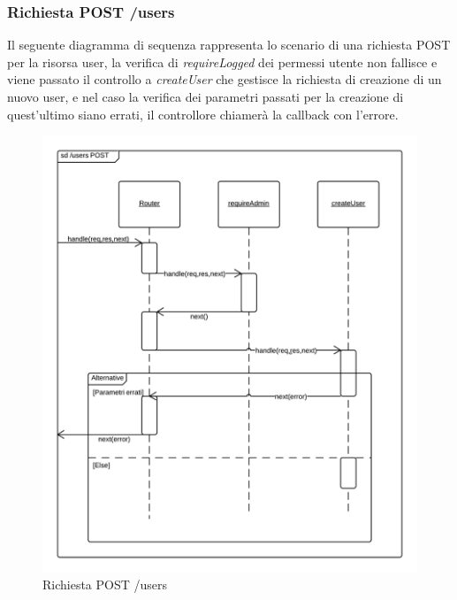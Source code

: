 \subsubsection{Richiesta POST /users} 
Il seguente diagramma di sequenza rappresenta lo scenario di una richiesta POST per la risorsa user, la verifica di \emph{requireLogged} dei permessi utente non fallisce e viene passato il controllo a \emph{createUser} che gestisce la richiesta di creazione di un nuovo user, e nel caso la verifica dei parametri passati per la creazione di quest'ultimo siano errati, il controllore chiamerà la callback con l'errore.
\begin{figure}[H]
	\begin{center} 
		\includegraphics[scale=0.20]{scenari/Users POST.png} 
		\caption{Richiesta POST /users}
	\end{center} 
\end{figure}

\pagebreak
